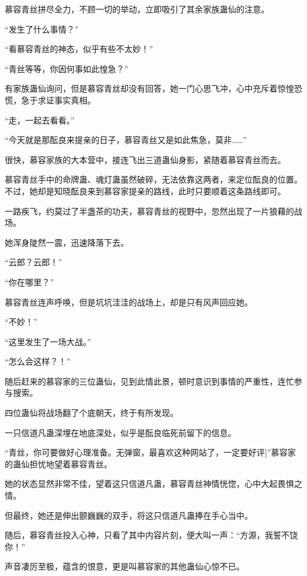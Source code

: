 
\begin{this_body}

慕容青丝拼尽全力，不顾一切的举动，立即吸引了其余家族蛊仙的注意。

“发生了什么事情？”

“看慕容青丝的神态，似乎有些不太妙！”

“青丝等等，你因何事如此惶急？”

有家族蛊仙询问，但是慕容青丝却没有回答，她一门心思飞冲，心中充斥着惊惶恐慌，急于求证事实真相。

“走，一起去看看。”

“今天就是那酝良来提亲的日子，慕容青丝又是如此焦急，莫非……”

很快，慕容家族的大本营中，接连飞出三道蛊仙身影，紧随着慕容青丝而去。

慕容青丝手中的命牌蛊、魂灯蛊虽然破碎，无法依靠这两者，来定位酝良的位置。不过，她却是知晓酝良来到慕容家提亲的路线，此时只要顺着这条路线即可。

一路疾飞，约莫过了半盏茶的功夫，慕容青丝的视野中，忽然出现了一片狼藉的战场。

她浑身陡然一震，迅速降落下去。

“云郎？云郎！”

“你在哪里？”

慕容青丝连声呼唤，但是坑坑洼洼的战场上，却是只有风声回应她。

“不妙！”

“这里发生了一场大战。”

“怎么会这样？！”

随后赶来的慕容家的三位蛊仙，见到此情此景，顿时意识到事情的严重性，连忙参与搜索。

四位蛊仙将战场翻了个底朝天，终于有所发现。

一只信道凡蛊深埋在地底深处，似乎是酝良临死前留下的信息。

“青丝，你可要做好心理准备。无弹窗，最喜欢这种网站了，一定要好评]”慕容家的蛊仙担忧地望着慕容青丝。

她的状态显然非常不佳，望着这只信道凡蛊，慕容青丝神情恍惚，心中大起畏惧之情。

但最终，她还是伸出颤巍巍的双手，将这只信道凡蛊捧在手心当中。

随后，慕容青丝投入心神，只看了其中内容片刻，便大叫一声：“方源，我誓不饶你！”

声音凄厉至极，蕴含的恨意，更是叫慕容家的其他蛊仙心惊不已。


\end{this_body}
